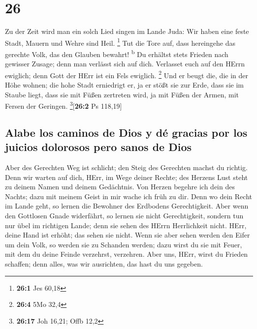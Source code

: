 \hypertarget{section-25}{%
\section{26}\label{section-25}}

 Zu der Zeit wird man ein solch Lied singen im Lande Juda:
Wir haben eine feste Stadt, Mauern und Wehre sind Heil. \footnote{\textbf{26:1}
  Jes 60,18}  Tut die Tore auf, dass hereingehe das
gerechte Volk, das den Glauben bewahrt! \textsuperscript{b}
 Du erhältst stets Frieden nach gewisser Zusage; denn man
verlässt sich auf dich.  Verlasset euch auf den HErrn
ewiglich; denn Gott der HErr ist ein Fels ewiglich. \footnote{\textbf{26:4}
  5Mo 32,4}  Und er beugt die, die in der Höhe wohnen; die
hohe Stadt erniedrigt er, ja er stößt sie zur Erde, dass sie im Staube
liegt,  dass sie mit Füßen zertreten wird, ja mit Füßen
der Armen, mit Fersen der Geringen. \footnote{\textbf{26:17} Joh 16,21;
  Offb 12,2}{[}\textbf{26:2} Ps 118,19{]}

\hypertarget{alabe-los-caminos-de-dios-y-duxe9-gracias-por-los-juicios-dolorosos-pero-sanos-de-dios}{%
\subsection{Alabe los caminos de Dios y dé gracias por los juicios
dolorosos pero sanos de
Dios}\label{alabe-los-caminos-de-dios-y-duxe9-gracias-por-los-juicios-dolorosos-pero-sanos-de-dios}}

 Aber des Gerechten Weg ist schlicht; den Steig des
Gerechten machst du richtig.  Denn wir warten auf dich,
HErr, im Wege deiner Rechte; des Herzens Lust steht zu deinem Namen und
deinem Gedächtnis.  Von Herzen begehre ich dein des
Nachts; dazu mit meinem Geist in mir wache ich früh zu dir. Denn wo dein
Recht im Lande geht, so lernen die Bewohner des Erdbodens Gerechtigkeit.
 Aber wenn den Gottlosen Gnade widerfährt, so lernen sie
nicht Gerechtigkeit, sondern tun nur übel im richtigen Lande; denn sie
sehen des HErrn Herrlichkeit nicht.  HErr, deine Hand ist
erhöht; das sehen sie nicht. Wenn sie aber sehen werden den Eifer um
dein Volk, so werden sie zu Schanden werden; dazu wirst du sie mit
Feuer, mit dem du deine Feinde verzehrst, verzehren. 
Aber uns, HErr, wirst du Frieden schaffen; denn alles, was wir
ausrichten, das hast du uns gegeben.

